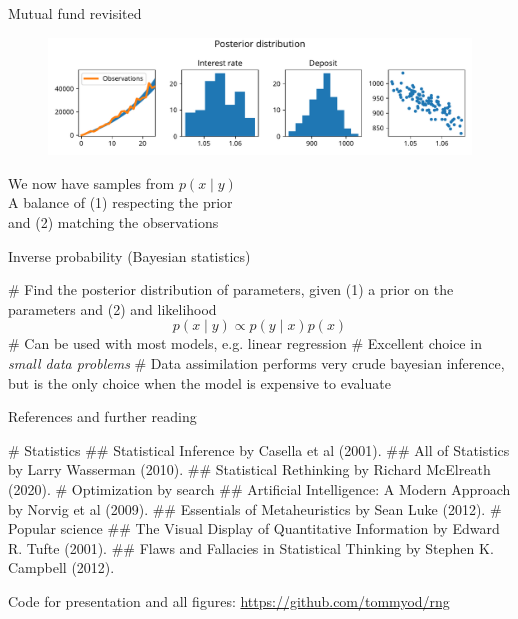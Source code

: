 \documentclass[12pt, aspectratio=149]{beamer}
\theoremstyle{plain}
\begin{document}
\begin{frame}[fragile]{Mutual fund revisited}
\vspace*{-1em}
\begin{center}
 \begin{figure}
    	\centering
    	\includegraphics[width=0.99\linewidth]{figures/esmda_posterior_no_truth.pdf}
 \end{figure}
 We now have samples from $p(x \mid y)$\\ \vspace*{1em}
 A balance of (1) respecting the prior \\and (2) matching the observations
 \end{center}
\end{frame}


\begin{frame}[fragile]{Inverse probability (Bayesian statistics)}
	\begin{easylist}[itemize]
		# Find the posterior distribution of parameters, given (1)
		a prior on the parameters and (2) and likelihood
		\begin{equation*}
		p(x \mid y) \propto p(y \mid x) p(x)
		\end{equation*}
		# Can be used with most models, e.g. linear regression
		# Excellent choice in \emph{small data problems}
		# Data assimilation performs very crude 
		bayesian inference, but is the only choice when the model is expensive to evaluate
	\end{easylist}
\end{frame}



\begin{frame}[fragile]{References and further reading}
\scriptsize
\begin{easylist}[itemize]
# Statistics
## Statistical Inference by Casella et al (2001).
## All of Statistics by Larry Wasserman (2010).
## Statistical Rethinking by Richard McElreath (2020).
# Optimization by search
## Artificial Intelligence: A Modern Approach by Norvig et al (2009).
## Essentials of Metaheuristics by Sean Luke (2012).
# Popular science
## The Visual Display of Quantitative Information by Edward R. Tufte (2001).
## Flaws and Fallacies in Statistical Thinking by Stephen K. Campbell (2012).
\end{easylist}
\normalsize
\begin{center}
Code for presentation and all figures: { \href{https://github.com/tommyod/rng}{https://github.com/tommyod/rng}}
\end{center}
\end{frame}
\end{document}
